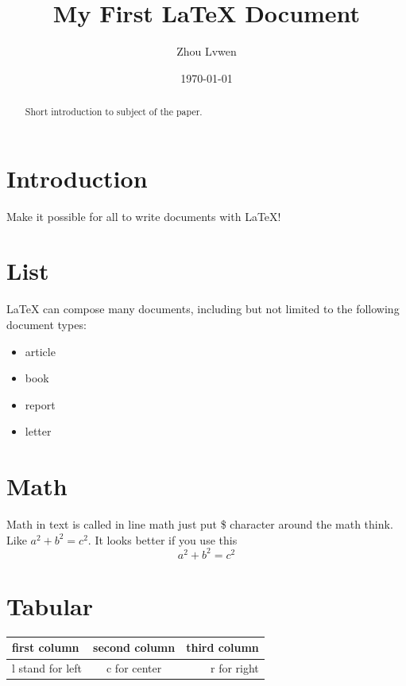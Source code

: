 \documentclass{article}
\title{My First \LaTeX{} Document}
\author{Zhou Lvwen}
\date{\today}
\begin{document}
\maketitle
\begin{abstract}
Short introduction to subject of the paper. 
\end{abstract}

\section{Introduction}
Make it possible for all to write documents with \LaTeX{}!

\section{List}
\LaTeX{} can compose many documents, including but not limited to the following document types: 
\begin{itemize}
\item article
\item book 
\item report 
\item letter 
\end{itemize}

\section{Math}
Math in text is called in line math just put \$ character around 
the math think. Like $a^2 + b^2 = c^2$. It looks better if you use this 
\[a^2 + b^2 = c^2\]

\section{Tabular}
\begin{tabular}{|l|c|r|}
\hline
first column & second column & third column\\
\hline 
l stand for left & c for center & r for right\\
\hline 
\end{tabular} 

\end{document}
